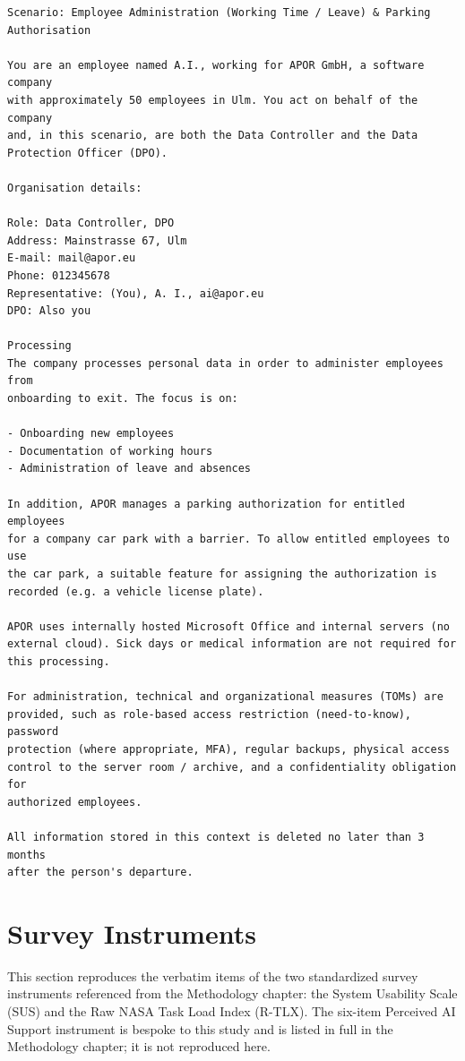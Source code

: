 \begin{verbatim}
Scenario: Employee Administration (Working Time / Leave) & Parking
Authorisation

You are an employee named A.I., working for APOR GmbH, a software company
with approximately 50 employees in Ulm. You act on behalf of the company
and, in this scenario, are both the Data Controller and the Data
Protection Officer (DPO).

Organisation details:

Role: Data Controller, DPO
Address: Mainstrasse 67, Ulm
E-mail: mail@apor.eu
Phone: 012345678
Representative: (You), A. I., ai@apor.eu
DPO: Also you

Processing
The company processes personal data in order to administer employees from
onboarding to exit. The focus is on:

- Onboarding new employees
- Documentation of working hours
- Administration of leave and absences

In addition, APOR manages a parking authorization for entitled employees
for a company car park with a barrier. To allow entitled employees to use
the car park, a suitable feature for assigning the authorization is
recorded (e.g. a vehicle license plate).

APOR uses internally hosted Microsoft Office and internal servers (no
external cloud). Sick days or medical information are not required for
this processing.

For administration, technical and organizational measures (TOMs) are
provided, such as role-based access restriction (need-to-know), password
protection (where appropriate, MFA), regular backups, physical access
control to the server room / archive, and a confidentiality obligation for
authorized employees.

All information stored in this context is deleted no later than 3 months
after the person's departure.
\end{verbatim}


\section{Survey Instruments}
\label{app:sus-rtlx-items}

This section reproduces the verbatim items of the two standardized survey instruments referenced from the Methodology chapter: the System Usability Scale (SUS) and the Raw NASA Task Load Index (R-TLX). The six-item Perceived AI Support instrument is bespoke to this study and is listed in full in the Methodology chapter; it is not reproduced here.

